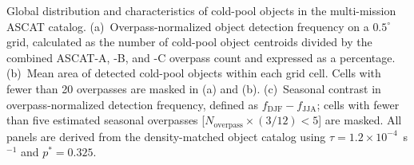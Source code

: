 \caption{
Global distribution and characteristics of cold-pool objects in the
multi-mission ASCAT catalog. (a)~Overpass-normalized object detection
frequency on a $0.5^{\circ}$ grid, calculated as the number of cold-pool
object centroids divided by the combined ASCAT-A, -B, and -C overpass
count and expressed as a percentage. (b)~Mean area of detected cold-pool
objects within each grid cell. Cells with fewer than 20 overpasses are
masked in (a) and (b). (c)~Seasonal contrast in overpass-normalized
detection frequency, defined as $f_{\mathrm{DJF}}-f_{\mathrm{JJA}}$; cells
with fewer than five estimated seasonal overpasses
[$N_{\mathrm{overpass}}\times(3/12)<5$] are masked. All panels are derived
from the density-matched object catalog using
$\tau=1.2\times10^{-4}$~s$^{-1}$ and $p^{*}=0.325$.
}
\label{fig:global_distribution}
